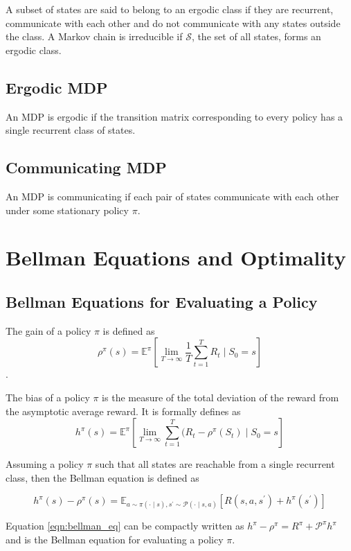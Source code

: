 A subset of states are said to belong to an ergodic class if they are recurrent, communicate with each other and do not communicate with any states outside the class.
A Markov chain is irreducible if $\mathcal{S}$, the set of all states, forms an ergodic class.

\subsection{Ergodic MDP}

An MDP is ergodic if the transition matrix corresponding to every policy has a single recurrent class of states.

\subsection{Communicating MDP}

An MDP is communicating if each pair of states communicate with each other under some stationary policy $\pi$.

\section{Bellman Equations and Optimality}

\subsection{Bellman Equations for Evaluating a Policy}

The gain of a policy $\pi$ is defined as 
$$\rho^\pi(s) = \mathbb{E}^\pi\left[\lim_{T \to \infty} \frac{1}{T} \sum_{t=1}^{T} R_t \mid S_0 = s\right]$$.

The bias of a policy $\pi$ is the measure of the total deviation of the reward from the asymptotic average reward.
It is formally defines as
$$h^\pi(s) = \mathbb{E}^\pi\left[\lim_{T \to \infty} \sum_{t=1}^{T} (R_t - \rho^\pi(S_t) \mid S_0 = s\right]$$

Assuming a policy $\pi$ such that all states are reachable from a single recurrent class, then the Bellman equation is defined as

\begin{equation}
    \label{eqn:bellman_eq}
    h^\pi(s) - \rho^\pi(s) = \mathbb{E}_{a \sim \pi(\cdot \mid s), s^\prime \sim \mathcal{P}(\cdot \mid  s, a)} \left[ R(s, a, s^\prime) + h^\pi(s^\prime) \right]
\end{equation}

Equation \ref{eqn:bellman_eq} can be compactly written as $h^\pi - \rho^\pi = R^\pi + \mathcal{P}^\pi h^\pi$ and is the Bellman equation for evaluating a policy $\pi$.

